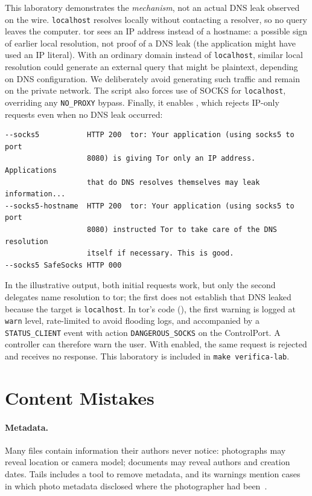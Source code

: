 This laboratory demonstrates the \emph{mechanism}, not an actual DNS leak observed on the wire. \texttt{localhost} resolves locally without contacting a resolver, so no query leaves the computer. tor sees an IP address instead of a hostname: a possible sign of earlier local resolution, not proof of a DNS leak (the application might have used an IP literal). With an ordinary domain instead of \texttt{localhost}, similar local resolution could generate an external query that might be plaintext, depending on DNS configuration. We deliberately avoid generating such traffic and remain on the private network. The script also forces use of SOCKS for \texttt{localhost}, overriding any \texttt{NO\_PROXY} bypass. Finally, it enables , which rejects IP-only requests even when no DNS leak occurred:
\begin{lstlisting}[numbers=none]
--socks5           HTTP 200  tor: Your application (using socks5 to port
                   8080) is giving Tor only an IP address. Applications
                   that do DNS resolves themselves may leak information...
--socks5-hostname  HTTP 200  tor: Your application (using socks5 to port
                   8080) instructed Tor to take care of the DNS resolution
                   itself if necessary. This is good.
--socks5 SafeSocks HTTP 000
\end{lstlisting}
In the illustrative output, both initial requests work, but only the second delegates name resolution to tor; the first does not establish that DNS leaked because the target is \texttt{localhost}. In tor's code (), the first warning is logged at \texttt{warn} level, rate-limited to avoid flooding logs, and accompanied by a \texttt{STATUS\_CLIENT} event with action \texttt{DANGEROUS\_SOCKS} on the ControlPort. A controller can therefore warn the user. With  enabled, the same request is rejected and  receives no response. This laboratory is included in \texttt{make verifica-lab}.

\section{Content Mistakes}\label{sec:opsec-contenuto}

\paragraph{Metadata.} Many files contain information their authors never notice: photographs may reveal location or camera model; documents may reveal authors and creation dates. Tails includes a tool to remove metadata, and its warnings mention cases in which photo metadata disclosed where the photographer had been~\cite{tailswarnings}.

